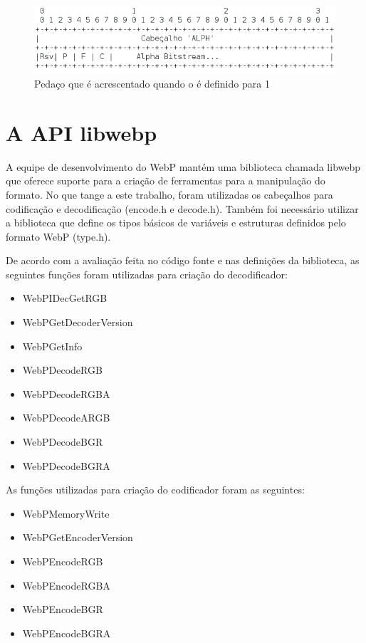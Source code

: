 \documentclass[espaco=simples,appendix=Name]{abnt}
\begin{document}
\begin{figure}[h]
  \centering
    \includegraphics[scale=0.4]{AlphaChunk.png}
  \caption{Pedaço que é acrescentado quando o  é definido para 1}
\end{figure}

\section{A API libwebp}

A equipe de desenvolvimento do WebP mantém uma biblioteca chamada libwebp que oferece suporte para a criação de ferramentas para a manipulação do formato. No que tange a este trabalho, foram utilizadas os cabeçalhos para codificação e decodificação (encode.h e decode.h). Também foi necessário utilizar a biblioteca que define os tipos básicos de variáveis e estruturas definidos pelo formato WebP (type.h).

De acordo com a avaliação feita no código fonte e nas definições da biblioteca, as seguintes funções foram utilizadas para criação do decodificador:

\begin{itemize}
	\item WebPIDecGetRGB
	\item WebPGetDecoderVersion
	\item WebPGetInfo
	\item WebPDecodeRGB
	\item WebPDecodeRGBA
	\item WebPDecodeARGB
	\item WebPDecodeBGR
	\item WebPDecodeBGRA
\end{itemize}

As funções utilizadas para criação do codificador foram as seguintes:

\begin{itemize}
	\item WebPMemoryWrite
	\item WebPGetEncoderVersion
	\item WebPEncodeRGB
	\item WebPEncodeRGBA
	\item WebPEncodeBGR
	\item WebPEncodeBGRA
\end{itemize}
\end{document}
